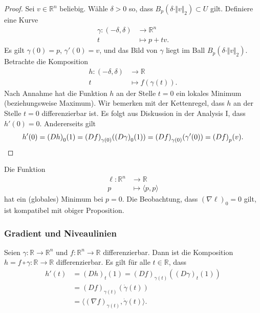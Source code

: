 \documentclass[../main.tex]{subfiles}
\begin{document}
\begin{proof}
  Sei $v \in \mathbb{R}^n$ beliebig.
  Wähle $\delta > 0$ so, dass $B_p(\delta \cdot \Vert v \Vert_2) \subset U$ 
  gilt.
  Definiere eine Kurve  
  \begin{align*}
    \gamma \colon (-\delta, \delta) & \to \mathbb{R}^n \\
    t & \mapsto p + tv.
  \end{align*}
  Es gilt $\gamma(0) = p$, $\gamma'(0) = v$, und das Bild von
  $\gamma$ liegt im Ball $B_p(\delta \cdot \Vert v \Vert_2)$.
  Betrachte die Komposition
  \begin{align*}
    h \colon (-\delta, \delta) & \to \mathbb{R} \\
    t & \mapsto f(\gamma(t)).
  \end{align*}
  Nach Annahme hat die Funktion $h$ an der Stelle $t = 0$ 
  ein lokales Minimum (beziehungsweise Maximum).
  Wir bemerken mit der Kettenregel,
  dass $h$ an der Stelle $t = 0$
  differenzierbar ist.
  Es folgt aus Diskussion in der Analysis I, dass $h'(0) = 0$.
  Andererseits gilt
  \[
    h'(0) = {(Dh)}_0(1) = {(Df)}_{\gamma(0)}({(D\gamma)}_0(1))
    = {(Df)}_{\gamma(0)}(\gamma'(0)) = {(Df)}_p(v).
    \qedhere
  \]
\end{proof}

\begin{example}
  Die Funktion
  \begin{align*}
    \ell \colon \mathbb{R}^n & \to \mathbb{R} \\
    p & \mapsto \langle p, p \rangle
  \end{align*}
  hat ein (globales) Minimum bei $p = 0$.
  Die Beobachtung, dass ${(\nabla \ell)}_0 = 0$ gilt,
  ist kompatibel mit obiger Proposition.
\end{example}

\subsubsection*{Gradient und Niveaulinien}
Seien $\gamma \colon \mathbb{R} \to \mathbb{R}^n$ 
und $f \colon \mathbb{R}^n \to \mathbb{R}$ differenzierbar.
Dann ist die Komposition $h = f \circ \gamma \colon \mathbb{R} \to \mathbb{R}$ 
differenzierbar. Es gilt für alle $t \in \mathbb{R}$, dass
\begin{align*}
   h'(t)   
   &= {(Dh)}_t(1) = {(Df)}_{\gamma(t)}({(D\gamma)}_t(1))  \\
   &= {(Df)}_{\gamma(t)}(\dot \gamma(t)) \\
   &= \langle {(\nabla f)}_{\gamma(t)}, \dot \gamma(t) \rangle.
\end{align*}
\end{document}
